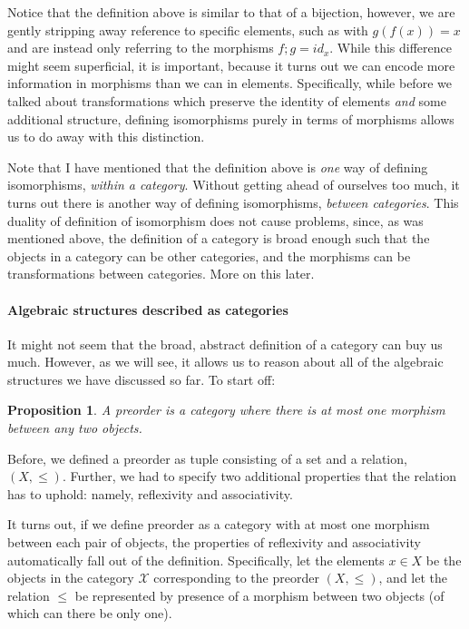 \documentclass[
  openany]{book}
\newtheorem{proposition}{Proposition}[chapter]
\theoremstyle{definition}
\theoremstyle{definition}
\theoremstyle{definition}
\theoremstyle{definition}
\theoremstyle{remark}
\begin{document}
Notice that the definition above is similar to that of a bijection, however, we are gently stripping away reference to specific elements, such as with \(g(f(x)) = x\) and are instead only referring to the morphisms \(f ;g = id_{x}\). While this difference might seem superficial, it is important, because it turns out we can encode more information in morphisms than we can in elements. Specifically, while before we talked about transformations which preserve the identity of elements \emph{and} some additional structure, defining isomorphisms purely in terms of morphisms allows us to do away with this distinction.

Note that I have mentioned that the definition above is \emph{one} way of defining isomorphisms, \emph{within a category}. Without getting ahead of ourselves too much, it turns out there is another way of defining isomorphisms, \emph{between categories}. This duality of definition of isomorphism does not cause problems, since, as was mentioned above, the definition of a category is broad enough such that the objects in a category can be other categories, and the morphisms can be transformations between categories. More on this later.

\paragraph{Algebraic structures described as categories}\label{algebraic-as-categories}

It might not seem that the broad, abstract definition of a category can buy us much. However, as we will see, it allows us to reason about all of the algebraic structures we have discussed so far. To start off:

\begin{proposition}
A preorder is a category where there is at most one morphism between any two objects.
\end{proposition}

Before, we defined a preorder as tuple consisting of a set and a relation, \((X, \leq)\). Further, we had to specify two additional properties that the relation has to uphold: namely, reflexivity and associativity.

It turns out, if we define preorder as a category with at most one morphism between each pair of objects, the properties of reflexivity and associativity automatically fall out of the definition. Specifically, let the elements \(x \in X\) be the objects in the category \(\mathcal{X}\) corresponding to the preorder \((X, \leq)\), and let the relation \(\leq\) be represented by presence of a morphism between two objects (of which can there be only one).
\end{document}
